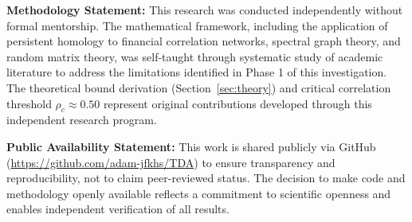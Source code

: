 \documentclass[12pt,letterpaper]{article}
\begin{document}
\textbf{Methodology Statement:} This research was conducted independently without formal mentorship. The mathematical framework, including the application of persistent homology to financial correlation networks, spectral graph theory, and random matrix theory, was self-taught through systematic study of academic literature to address the limitations identified in Phase 1 of this investigation. The theoretical bound derivation (Section~\ref{sec:theory}) and critical correlation threshold $\rho_c \approx 0.50$ represent original contributions developed through this independent research program.

\textbf{Public Availability Statement:} This work is shared publicly via GitHub (\url{https://github.com/adam-jfkhs/TDA}) to ensure transparency and reproducibility, not to claim peer-reviewed status. The decision to make code and methodology openly available reflects a commitment to scientific openness and enables independent verification of all results.
\end{document}
